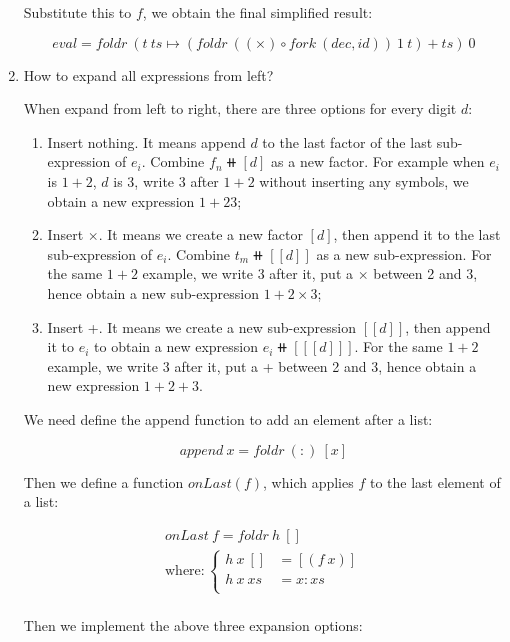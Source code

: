 \documentclass[UTF8]{article}
\begin{document}
\begin{enumerate}
Substitute this to $f$, we obtain the final simplified result:

\[
eval = foldr\ (t\ ts \mapsto (foldr\ ((\times) \circ fork\ (dec, id))\ 1\ t) + ts)\ 0
\]

\item{How to expand all expressions from left?}

When expand from left to right, there are three options for every digit $d$:

\begin{enumerate}
\item Insert nothing. It means append $d$ to the last factor of the last sub-expression of $e_i$. Combine $f_n \doubleplus [d]$ as a new factor. For example when $e_i$ is $1 + 2$, $d$ is 3, write 3 after $1 + 2$ without inserting any symbols, we obtain a new expression $1 + 23$;

\item Insert $\times$. It means we create a new factor $[d]$, then append it to the last sub-expression of $e_i$. Combine $t_m \doubleplus [[d]]$ as a new sub-expression. For the same $1 + 2$ example, we write 3 after it, put a $\times$ between 2 and 3, hence obtain a new sub-expression $1 + 2 \times 3$;

\item Insert +. It means we create a new sub-expression $[[d]]$, then append it to $e_i$ to obtain a new expression $e_i \doubleplus [[[d]]]$. For the same $1 + 2$ example, we write 3 after it, put a + between 2 and 3, hence obtain a new expression $1 + 2 + 3$.
\end{enumerate}

We need define the append function to add an element after a list:

\[
append\ x = foldr\ (:)\ [x]
\]

Then we define a function $onLast(f)$, which applies $f$ to the last element of a list:

\[\begin{array}{l}
onLast\ f = foldr\ h\ [] \\
\text{where}: \begin{cases}
  h\ x\ [] & = [(f\ x)] \\
  h\ x\ xs & = x : xs \\
\end{cases} \\
\end{array}\]

Then we implement the above three expansion options:


\end{enumerate}
\end{document}
